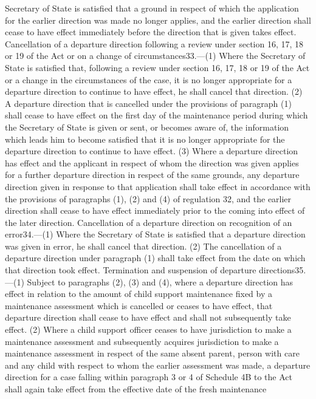 \documentclass[a4paper]{article}
\begin{document}
Secretary of State is satisfied that a ground in respect of which the
application for the earlier direction was made no longer applies, and the
earlier direction shall cease to have effect immediately before the direction
that is given takes effect.
Cancellation of a departure direction following a review under section 16, 17,
18 or 19 of the Act or on a change of circumstances33.—(1) Where the Secretary
of State is satisfied that, following a review under section 16, 17, 18 or 19 of
the Act or a change in the circumstances of the case, it is no longer
appropriate for a departure direction to continue to have effect, he shall
cancel that direction.
(2) A departure direction that is cancelled under the provisions of paragraph
(1) shall cease to have effect on the first day of the maintenance period during
which the Secretary of State is given or sent, or becomes aware of, the
information which leads him to become satisfied that it is no longer appropriate
for the departure direction to continue to have effect.
(3) Where a departure direction has effect and the applicant in respect of whom
the direction was given applies for a further departure direction in respect of
the same grounds, any departure direction given in response to that application
shall take effect in accordance with the provisions of paragraphs (1), (2) and
(4) of regulation 32, and the earlier direction shall cease to have effect
immediately prior to the coming into effect of the later direction.
Cancellation of a departure direction on recognition of an error34.—(1) Where
the Secretary of State is satisfied that a departure direction was given in
error, he shall cancel that direction.
(2) The cancellation of a departure direction under paragraph (1) shall take
effect from the date on which that direction took effect.
Termination and suspension of departure directions35.—(1) Subject to paragraphs
(2), (3) and (4), where a departure direction has effect in relation to the
amount of child support maintenance fixed by a maintenance assessment which is
cancelled or ceases to have effect, that departure direction shall cease to have
effect and shall not subsequently take effect.
(2) Where a child support officer ceases to have jurisdiction to make a
maintenance assessment and subsequently acquires jurisdiction to make a
maintenance assessment in respect of the same absent parent, person with care
and any child with respect to whom the earlier assessment was made, a departure
direction for a case falling within paragraph 3 or 4 of Schedule 4B to the Act
shall again take effect from the effective date of the fresh maintenance
\end{document}

